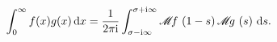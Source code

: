 \[\int^{\infty}_{0}f(x)g(x)\,\mathrm{d}x=\frac{1}{2\pi\mathrm{i}}\*\int^{\sigma+%
\mathrm{i}\infty}_{\sigma-\mathrm{i}\infty}\mathscr{M}\mskip-3.0muf\mskip 3.0%
mu\left(1-s\right)\mathscr{M}\mskip-3.0mug\mskip 3.0mu\left(s\right)\,\mathrm{%
d}s.\]